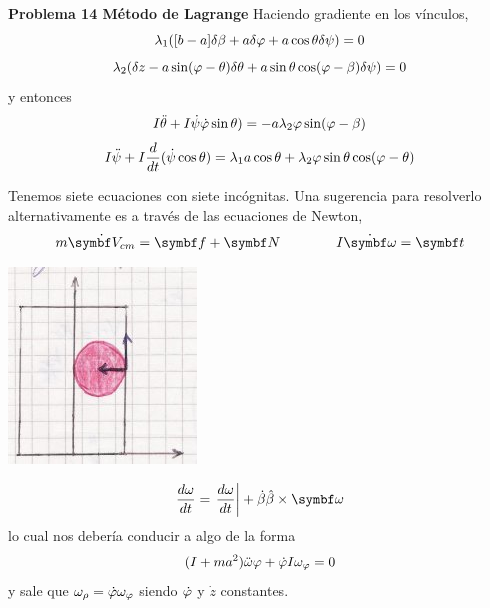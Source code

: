 \documentclass[10pt,oneside]{CBFT_book}
\begin{document}
\begin{ejemplo}{\bf Problema 14 Método de Lagrange}
Haciendo gradiente en los vínculos,
\[
	\lambda_1 ( [b-a] \delta\beta + a\delta\varphi + a\cos\theta\delta\psi) = 0
\]
\[
	\lambda_2 (\delta z - a\sin(\varphi-\theta)\delta\theta + a\sin\theta \cos(\varphi-\beta)\delta\psi) = 0
\]
y entonces
\[
	I \ddot{\theta} +  I \dot{\psi} \dot{\varphi} \sin\theta ) =
	- a \lambda_2 \varphi \sin (\varphi - \beta)
\]
\[
	I \ddot{\psi} +  I \frac{d^{\hspace{-0.05em}} {}}{d {t}^{\hspace{-0.05em}}}( \dot{\psi} \cos\theta ) =
	\lambda_1 a \cos\theta + \lambda_2 \varphi \sin \theta \cos(\varphi - \theta)
\]

Tenemos siete ecuaciones con siete incógnitas. Una sugerencia para resolverlo alternativamente
es a través de las ecuaciones de Newton,
\[
	m\dot{\vb{V}_{cm}} = \vb{f} + \vb{N} \qquad \qquad 
	I \dot{\vb{\omega}} = \vb{t}
\]

\includegraphics[scale=0.5]{images/fig_mc_lagrangebola_2.jpg}

\[
	\dtot{\omega}{t} = \left.\dtot{\omega}{t}\right| + \dot{\beta}\hat{\beta} \times \vb{\omega}
\]
lo cual nos debería conducir a algo de la forma
\[
	(I + ma^2)\ddot{\omega}\varphi + \dot{\varphi} I \omega_\varphi = 0
\]
y sale que $\omega_\rho = \dot{\varphi} \omega_\varphi$ siendo $\dot{\varphi}$ y $\dot{z}$ constantes.

\end{ejemplo}
\end{document}
